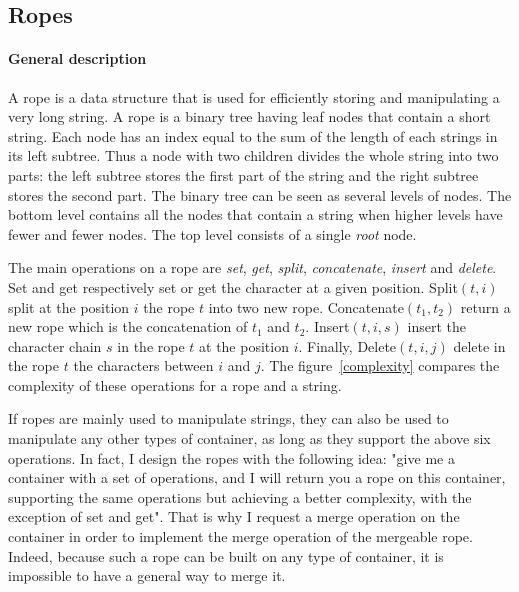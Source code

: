 \documentclass{article}
\renewcommand{\-}{\hyp}
\begin{document}
\subsection{Ropes}

\paragraph{General description}
A rope is a data structure that is used for efficiently storing and manipulating a very long string.
A rope is a binary tree having leaf nodes that contain a short string.
Each node has an index equal to the sum of the length of each strings in its left subtree.
Thus a node with two children divides the whole string into two parts: the left subtree stores the first part of the string and the right subtree stores the second part.
The binary tree can be seen as several levels of nodes.
The bottom level contains all the nodes that contain a string when higher levels have fewer and fewer nodes.
The top level consists of a single \emph{root} node.

The main operations on a rope are \emph{set}, \emph{get}, \emph{split}, \emph{concatenate}, \emph{insert} and \emph{delete}. Set and get respectively set or get the character at a given position. Split$(t, i)$ split at the position $i$ the rope $t$ into two new rope. Concatenate$(t_1, t_2)$ return a new rope which is the concatenation of $t_1$ and $t_2$. Insert$(t, i, s)$ insert the character chain $s$ in the rope $t$ at the position $i$. Finally, Delete$(t, i, j)$ delete in the rope $t$ the characters between $i$ and $j$. The figure~\ref{complexity} compares the complexity of these operations for a rope and a string.

If ropes are mainly used to manipulate strings, they can also be used to manipulate any other types of container, as long as they support the above six operations.
In fact, I design the ropes with the following idea:
"give me a container with a set of operations, and I will return you a rope on this container, supporting the same operations but achieving a better complexity, with the exception of set and get".
That is why I request a merge operation on the container in order to implement the merge operation of the mergeable rope.
Indeed, because such a rope can be built on any type of container, it is impossible to have a general way to merge it.
\end{document}
